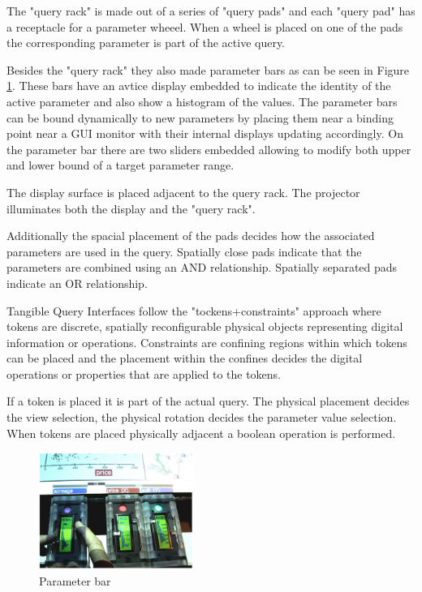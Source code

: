 The "query rack" is made out of a series of "query pads" and each "query pad" has a receptacle for a parameter wheeel. When a wheel is placed on one of the pads the corresponding parameter is part of the active query. 

Besides the "query rack" they also made parameter bars as can be seen in Figure \ref{fig:tanquery2}. These bars have an avtice display embedded to indicate the identity of the active parameter and also show a histogram of the values. The parameter bars can be bound dynamically to new parameters by placing them near a binding point near a GUI monitor with their internal displays updating accordingly. On the parameter bar there are two sliders embedded allowing to modify both upper and lower bound of a target parameter range. 

The display surface is placed adjacent to the query rack. 
The projector illuminates both the display and the "query rack". 

Additionally the spacial placement of the pads decides how the associated parameters are used in the query. Spatially close pads indicate that the parameters are combined using an AND relationship. Spatially separated pads indicate an OR relationship. 

Tangible Query Interfaces follow the "tockens+constraints" approach where tokens are discrete, spatially reconfigurable physical objects representing digital information or operations. Constraints are confining regions within which tokens can be placed and the placement within the confines decides the digital operations or properties that are applied to the tokens. 

If a token is placed it is part of the actual query. The physical placement decides the view selection, the physical rotation decides the parameter value selection. When tokens are placed physically adjacent a boolean operation is performed. 

\begin{figure}
\centering
\includegraphics[width=0.45\textwidth]{figures/TangibleQueryInterfaces3.jpg}
\caption{Parameter bar}
\label{fig:tanquery2}
\end{figure}

